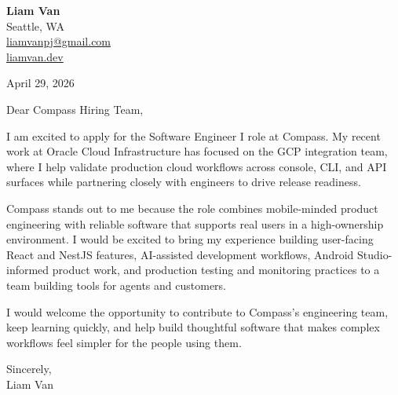 \documentclass[letterpaper,11pt]{article}
\begin{document}
\begin{flushleft}
\textbf{\Large Liam Van} \\
Seattle, WA \\
\href{mailto:liamvanpj@gmail.com}{liamvanpj@gmail.com} \\
\href{https://liamvan.dev}{liamvan.dev}
\end{flushleft}

April 29, 2026

\noindent Dear Compass Hiring Team,

\noindent I am excited to apply for the Software Engineer I role at Compass. My recent work at Oracle Cloud Infrastructure has focused on the GCP integration team, where I help validate production cloud workflows across console, CLI, and API surfaces while partnering closely with engineers to drive release readiness.

\noindent Compass stands out to me because the role combines mobile-minded product engineering with reliable software that supports real users in a high-ownership environment. I would be excited to bring my experience building user-facing React and NestJS features, AI-assisted development workflows, Android Studio-informed product work, and production testing and monitoring practices to a team building tools for agents and customers.

\noindent I would welcome the opportunity to contribute to Compass's engineering team, keep learning quickly, and help build thoughtful software that makes complex workflows feel simpler for the people using them.

\noindent Sincerely, \\
Liam Van
\end{document}
